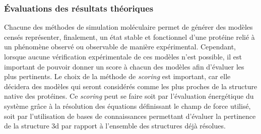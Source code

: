 

\subsubsection{Évaluations des résultats théoriques} \label{simu_eval}

Chacune des méthodes de simulation moléculaire permet de générer des modèles censés représenter, finalement, un état stable et fonctionnel d'une protéine relié à un phénomène observé ou observable de manière expérimental. Cependant, lorsque aucune vérification expérimentale de ces modèles n'est possible, il est important de pouvoir donner un score à chacun des modèles afin d'évaluer les plus pertinents. Le choix de la méthode de \textit{scoring} est important, car elle décidera des modèles qui seront considérés comme les plus proches de la structure native des protéines. Ce \textit{scoring} peut se faire soit par l'évaluation énergétique du système grâce à la résolution des équations définissant le champ de force utilisé, soit par l'utilisation de bases de connaissances permettant d'évaluer la pertinence de la structure 3d par rapport à l'ensemble des structures déjà résolues.

